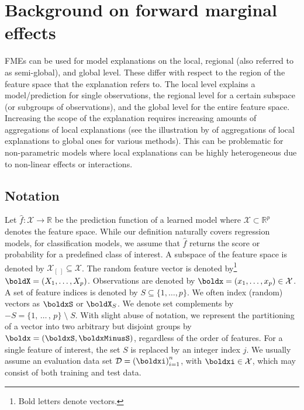 \section{Background on forward marginal effects}


FMEs can be used for model explanations on the local, regional (also referred to as semi-global), and global level. These differ with respect to the region of the feature space that the explanation refers to. The local level explains a model/prediction for single observations, the regional level for a certain subspace (or subgroups of observations), and the global level for the entire feature space. 
Increasing the scope of the explanation requires increasing amounts of aggregations of local explanations (see the illustration by \citet{scholbeck_framework} of aggregations of local explanations to global ones for various methods). This can be problematic for non-parametric models where local explanations can be highly heterogeneous due to non-linear effects or interactions.

\subsection{Notation}

Let $\widehat{f}:\mathcal{X} \rightarrow \mathbb{R}$ be the prediction function of a learned model where $\mathcal{X} \subset \mathbb{R}^{p}$ denotes the feature space. While our definition naturally covers regression models, for classification models, we assume that $\widehat{f}$ returns the score or probability for a predefined class of interest. A subspace of the feature space is denoted by $\mathcal{X}_{[\;]} \subseteq \mathcal{X}$. 
The random feature vector is denoted by\footnote{Bold letters denote vectors.} $\boldX = (X_1, \dots, X_p)$. 
Observations are denoted by $\boldx = (x_1, \dots, x_p) \in \mathcal{X}$.
A set of feature indices is denoted by $S \subseteq \{1, \dots, p\}$. 
We often index (random) vectors as $\boldxS$ or $\boldX_S$.
We denote set complements by $-S = \{1, \, \dots\, , \, p\} \; \setminus \; S$. 
With slight abuse of notation, we represent the partitioning of a vector into two arbitrary but disjoint groups by $\boldx = (\boldxS, \boldxMinusS)$, regardless of the order of features. 
For a single feature of interest, the set $S$ is replaced by an integer index $j$. 
We usually assume an evaluation data set $\mathcal{D} = \left(\boldxi\right)_{i = 1}^n$, with $\boldxi \in \mathcal{X}$, which may consist of both training and test data.

